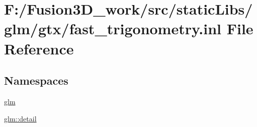 \hypertarget{fast__trigonometry_8inl}{}\section{F\+:/\+Fusion3\+D\+\_\+work/src/static\+Libs/glm/gtx/fast\+\_\+trigonometry.inl File Reference}
\label{fast__trigonometry_8inl}
\subsection*{Namespaces}
\begin{DoxyCompactItemize}
\item 
 \hyperlink{namespaceglm}{glm}
\item 
 \hyperlink{namespaceglm_1_1detail}{glm\+::detail}
\end{DoxyCompactItemize}
